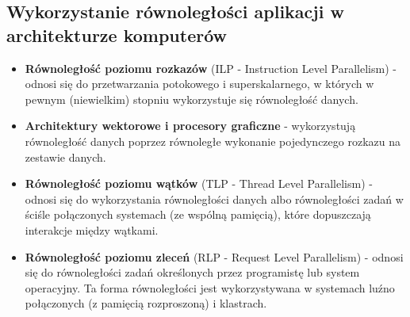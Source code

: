 \documentclass[a4paper,twoside]{article}
\begin{document}
\subsection{Wykorzystanie równoległości aplikacji w architekturze komputerów}
\begin{itemize}
	\item \textbf{Równoległość poziomu rozkazów} (ILP - Instruction Level Parallelism) - odnosi się do przetwarzania potokowego i superskalarnego, w których w pewnym (niewielkim) stopniu wykorzystuje się równoległość danych.
	\item \textbf{Architektury wektorowe i procesory graficzne} - wykorzystują równoległość danych poprzez równoległe wykonanie pojedynczego rozkazu na zestawie danych.
	\item \textbf{Równoległość poziomu wątków} (TLP - Thread Level Parallelism) - odnosi się do wykorzystania równoległości danych albo równoległości zadań w ściśle połączonych systemach (ze wspólną pamięcią), które dopuszczają interakcje między wątkami.
	\item \textbf{Równoległość poziomu zleceń} (RLP - Request Level Parallelism) - odnosi się do równoległości zadań określonych przez programistę lub system operacyjny. Ta forma równoległości jest wykorzystywana w systemach luźno połączonych (z pamięcią rozproszoną) i klastrach.
\end{itemize}
\vfill
\end{document}
